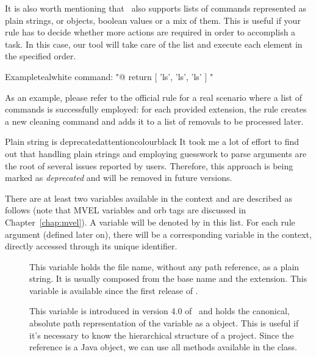 \begin{description}
\begin{description}
It is also worth mentioning that \arara\ also supports lists of commands represented as plain strings,  or  objects, boolean values or a mix of them. This is useful if your rule has to decide whether more actions are required in order to accomplish a task. In this case, our tool will take care of the list and execute each element in the specified order.

\begin{codebox}{Example}{teal}{\icnote}{white}
command: "@{ return [ 'ls', 'ls', 'ls' ] }"
\end{codebox}

As an example, please refer to the official  rule for a real scenario where a list of commands is successfully employed: for each provided extension, the rule creates a new cleaning command and adds it to a list of removals to be processed later.

\begin{messagebox}{Plain string is deprecated}{attentioncolour}{\icattention}{black}
It took me a lot of effort to find out that handling plain strings and employing guesswork to parse arguments are the root of several issues reported by users. Therefore, this approach is being marked as \emph{deprecated} and will be removed in future versions.
\end{messagebox}

There are at least two variables available in the  context and are described as follows (note that \gls{MVEL} variables and orb tags are discussed in Chapter~\ref{chap:mvel}). A variable will be denoted by  in this list. For each rule argument (defined later on), there will be a corresponding variable in the  context, directly accessed through its unique identifier.

\begin{description}
\item[] This variable holds the file name, without any path reference, as a plain string. It is usually composed from the base name and the extension. This variable is available since the first release of \arara.

\item[] This variable is introduced in version 4.0 of \arara\ and holds the canonical, absolute path representation of the  variable as a  object. This is useful if it's necessary to know the hierarchical structure of a project. Since the reference is a Java object, we can use all methods available in the  class.
\end{description}


\end{description}
\end{description}
